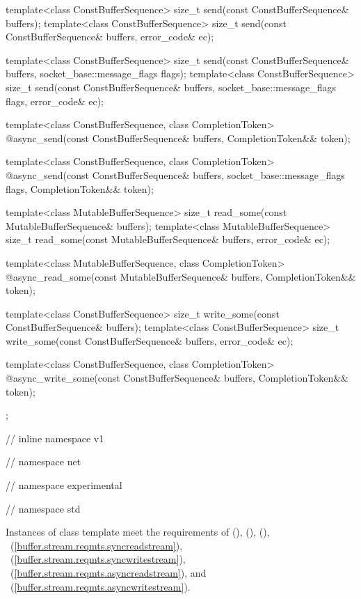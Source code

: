 \begin{codeblock}
{{{{{    template<class ConstBufferSequence>
      size_t send(const ConstBufferSequence& buffers);
    template<class ConstBufferSequence>
      size_t send(const ConstBufferSequence& buffers, error_code& ec);

    template<class ConstBufferSequence>
      size_t send(const ConstBufferSequence& buffers,
                  socket_base::message_flags flags);
    template<class ConstBufferSequence>
      size_t send(const ConstBufferSequence& buffers,
                  socket_base::message_flags flags, error_code& ec);

    template<class ConstBufferSequence, class CompletionToken>
      @\DEDUCED@ async_send(const ConstBufferSequence& buffers,
                         CompletionToken&& token);

    template<class ConstBufferSequence, class CompletionToken>
      @\DEDUCED@ async_send(const ConstBufferSequence& buffers,
                         socket_base::message_flags flags,
                         CompletionToken&& token);

    template<class MutableBufferSequence>
      size_t read_some(const MutableBufferSequence& buffers);
    template<class MutableBufferSequence>
      size_t read_some(const MutableBufferSequence& buffers,
                       error_code& ec);

    template<class MutableBufferSequence, class CompletionToken>
      @\DEDUCED@ async_read_some(const MutableBufferSequence& buffers,
                              CompletionToken&& token);

    template<class ConstBufferSequence>
      size_t write_some(const ConstBufferSequence& buffers);
    template<class ConstBufferSequence>
      size_t write_some(const ConstBufferSequence& buffers,
                        error_code& ec);

    template<class ConstBufferSequence, class CompletionToken>
      @\DEDUCED@ async_write_some(const ConstBufferSequence& buffers,
                               CompletionToken&& token);
  };

} // inline namespace v1
} // namespace net
} // namespace experimental
} // namespace std
\end{codeblock}

\pnum
Instances of class template  meet the requirements of  (),  (),  (), ~(\ref{buffer.stream.reqmts.syncreadstream}), ~(\ref{buffer.stream.reqmts.syncwritestream}), ~(\ref{buffer.stream.reqmts.asyncreadstream}), and ~(\ref{buffer.stream.reqmts.asyncwritestream}).

